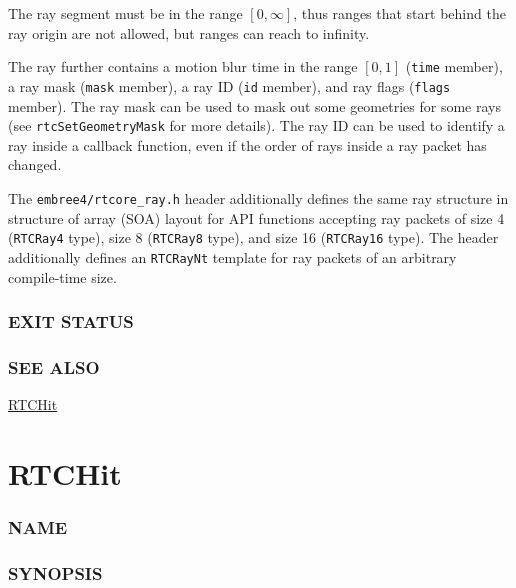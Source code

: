 The ray segment must be in the range \([0, \infty]\), thus ranges that
start behind the ray origin are not allowed, but ranges can reach to
infinity.

The ray further contains a motion blur time in the range \([0, 1]\)
(\texttt{time} member), a ray mask (\texttt{mask} member), a ray ID
(\texttt{id} member), and ray flags (\texttt{flags} member). The ray
mask can be used to mask out some geometries for some rays (see
\texttt{rtcSetGeometryMask} for more details). The ray ID can be used to
identify a ray inside a callback function, even if the order of rays
inside a ray packet has changed.

The \texttt{embree4/rtcore\_ray.h} header additionally defines the same
ray structure in structure of array (SOA) layout for API functions
accepting ray packets of size 4 (\texttt{RTCRay4} type), size 8
(\texttt{RTCRay8} type), and size 16 (\texttt{RTCRay16} type). The
header additionally defines an \texttt{RTCRayNt} template for ray
packets of an arbitrary compile-time size.

\subsubsection{EXIT STATUS}\label{exit-status}

\subsubsection{SEE ALSO}\label{see-also}

\hyperref[rtchit]{RTCHit}

\pagebreak

\section{RTCHit}\label{rtchit}

\subsubsection{NAME}\label{name}

\begin{Shaded}
\begin{Highlighting}[]
\OperatorTok{{-}}
\end{Highlighting}
\end{Shaded}

\subsubsection{SYNOPSIS}\label{synopsis}

